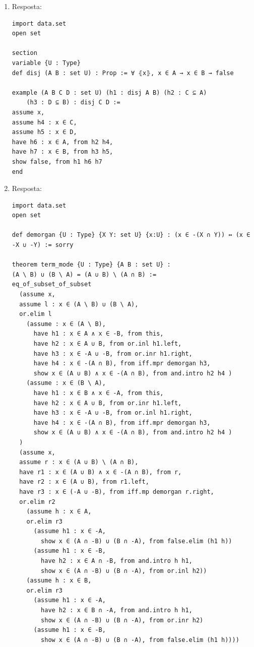 \begin{enumerate}
\begin{enumerate}
\begin{lstlisting}
example : -(A ∪ B) = -A ∩ -B :=
ext (assume x, iff.intro
(assume h₁ : x ∈ -(A ∪ B),
  have g₁ : x ∈ -A, from
    assume h₂ : x ∈ A,
    have h₃ : x ∈ A ∪ B, from or.inl h₂, (h₁ h₃),
  have g₂ : x ∈ -B, from
    assume h₂ : x ∈ B,
    have h₃ : x ∈ A ∪ B, from or.inr h₂, (h₁ h₃),
    show x ∈ -A ∩ -B, from ⟨g₁, g₂⟩)
(assume h₁ : x ∈ -A ∩ -B,
  show x ∈ -(A ∪ B), from
    assume h₂ : x ∈ A ∪ B,
    or.elim h₂
      (assume h3 : x ∈ A, h₁.left h3)
      (assume h3 : x ∈ B, h₁.right h3))) \end{lstlisting}
\end{enumerate}

\item Resposta:
\begin{lstlisting}
import data.set
open set

section
variable {U : Type}
def disj (A B : set U) : Prop := ∀ ⦃x⦄, x ∈ A → x ∈ B → false

example (A B C D : set U) (h1 : disj A B) (h2 : C ⊆ A)
    (h3 : D ⊆ B) : disj C D :=
assume x,
assume h4 : x ∈ C,
assume h5 : x ∈ D,
have h6 : x ∈ A, from h2 h4,
have h7 : x ∈ B, from h3 h5,
show false, from h1 h6 h7
end
\end{lstlisting}

\item Resposta:
\begin{lstlisting}
import data.set
open set

def demorgan {U : Type} {X Y: set U} {x:U} : (x ∈ -(X ∩ Y)) ↔ (x ∈ -X ∪ -Y) := sorry

theorem term_mode {U : Type} {A B : set U} : 
(A \ B) ∪ (B \ A) = (A ∪ B) \ (A ∩ B) :=
eq_of_subset_of_subset
  (assume x,
  assume l : x ∈ (A \ B) ∪ (B \ A),
  or.elim l
    (assume : x ∈ (A \ B),
      have h1 : x ∈ A ∧ x ∈ -B, from this,
      have h2 : x ∈ A ∪ B, from or.inl h1.left,
      have h3 : x ∈ -A ∪ -B, from or.inr h1.right,      
      have h4 : x ∈ -(A ∩ B), from iff.mpr demorgan h3,
      show x ∈ (A ∪ B) ∧ x ∈ -(A ∩ B), from and.intro h2 h4 )
    (assume : x ∈ (B \ A),
      have h1 : x ∈ B ∧ x ∈ -A, from this,
      have h2 : x ∈ A ∪ B, from or.inr h1.left,
      have h3 : x ∈ -A ∪ -B, from or.inl h1.right,
      have h4 : x ∈ -(A ∩ B), from iff.mpr demorgan h3,
      show x ∈ (A ∪ B) ∧ x ∈ -(A ∩ B), from and.intro h2 h4 )
  )
  (assume x,
  assume r : x ∈ (A ∪ B) \ (A ∩ B),
  have r1 : x ∈ (A ∪ B) ∧ x ∈ -(A ∩ B), from r,
  have r2 : x ∈ (A ∪ B), from r1.left,
  have r3 : x ∈ (-A ∪ -B), from iff.mp demorgan r.right,
  or.elim r2
    (assume h : x ∈ A,
    or.elim r3
      (assume h1 : x ∈ -A,
        show x ∈ (A ∩ -B) ∪ (B ∩ -A), from false.elim (h1 h))
      (assume h1 : x ∈ -B,
        have h2 : x ∈ A ∩ -B, from and.intro h h1,
        show x ∈ (A ∩ -B) ∪ (B ∩ -A), from or.inl h2))
    (assume h : x ∈ B,
    or.elim r3
      (assume h1 : x ∈ -A,
        have h2 : x ∈ B ∩ -A, from and.intro h h1,
        show x ∈ (A ∩ -B) ∪ (B ∩ -A), from or.inr h2)
      (assume h1 : x ∈ -B,
        show x ∈ (A ∩ -B) ∪ (B ∩ -A), from false.elim (h1 h))))\end{lstlisting}


\end{enumerate}
